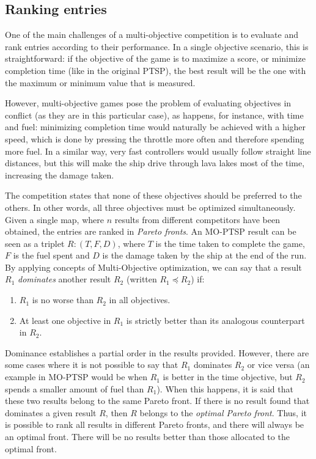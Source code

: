 \documentclass[conference]{IEEEtran}
\begin{document}
\subsection{Ranking entries}

One of the main challenges of a multi-objective competition is to evaluate and rank entries according to their performance. In a single objective scenario, this is straightforward: if the objective of the game is to maximize a score, or minimize completion time (like in the original PTSP), the best result will be the one with the maximum or minimum value that is measured.

However, multi-objective games pose the problem of evaluating objectives in conflict (as they are in this particular case), as happens, for instance, with time and fuel: minimizing completion time would naturally be achieved with a higher speed, which is done by pressing the throttle more often and therefore spending more fuel. In a similar way, very fast controllers  would usually follow straight line distances, but this will make the ship drive through lava lakes most of the time, increasing the damage taken.

The competition states that none of these objectives should be preferred to the others. In other words, all three objectives must be optimized simultaneously. Given a single map, where $n$ results from different competitors have been obtained, the entries are ranked in \textit{Pareto fronts}. An MO-PTSP result can be seen as a triplet $R: (T, F, D)$, where $T$ is the time taken to complete the game, $F$ is the fuel spent and $D$ is the damage taken by the ship at the end of the run. By applying concepts of Multi-Objective optimization, we can say that a result $R_1$ \textit{dominates} another result $R_2$ (written $R_1 \preceq R_2$) if:

\begin{enumerate}
\item $R_1$ is no worse than $R_2$ in all objectives.
\item At least one objective in $R_1$ is strictly better than its analogous counterpart in $R_2$.
\end{enumerate}

Dominance establishes a partial order in the results provided. However, there are some cases where it is not possible to say that $R_1$ dominates $R_2$ or vice versa (an example in MO-PTSP would be when $R_1$ is better in the time objective, but $R_2$ spends a smaller amount of fuel than $R_1$). When this happens, it is said that these two results belong to the same Pareto front. If there is no result found that dominates a given result $R$, then $R$ belongs to the \textit{optimal Pareto front}. Thus, it is possible to rank all results in different Pareto fronts, and there will always be an optimal front. There will be no results better than those allocated to the optimal front. 
\end{document}
